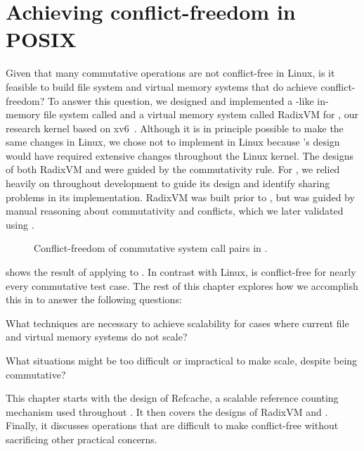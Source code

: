 \section{Achieving conflict-freedom in POSIX}

Given that many commutative operations are not conflict-free in Linux,
is it feasible to build file system and virtual memory systems that
do achieve conflict-freedom?
%
To answer this
question, we designed and implemented a -like in-memory
file system called \fs and a virtual memory system called RadixVM for
\sys, our research kernel based on xv6~\cite{xv6}.
%
Although it is in principle possible to make the same changes in Linux,
we chose not to implement \fs in Linux because \fs's design
would have required extensive changes throughout the Linux kernel.
%
The designs of both RadixVM and \fs were guided by the
commutativity rule.  For \fs, we relied heavily on \tool throughout
development to guide its design and identify sharing problems in its
implementation.  RadixVM
was built prior to
\tool, but was guided by manual reasoning about commutativity and
conflicts, which we later validated using \tool.

\begin{figure*}
\small
\centering
{}
\caption{Conflict-freedom of commutative system call pairs in \sys.}
\label{fig:testcase-breakdown-sv6}
\end{figure*}

 shows the result of applying \tool
to \sys.  In contrast with Linux, \sys is conflict-free for nearly
every commutative test case.  The rest of this chapter explores how we
accomplish this in \sys to answer the following questions:

\begin{CompactItemize}

\item What techniques are necessary to achieve scalability for
      cases where current file and virtual memory systems do not
      scale?

\item What situations might be too difficult or impractical to
      make scale, despite being commutative?

\end{CompactItemize}

This chapter starts with the design of Refcache, a scalable reference
counting mechanism used throughout \sys.  It then covers the designs
of RadixVM and \fs.  Finally, it discusses operations that are
difficult to make conflict-free without sacrificing other practical
concerns.

